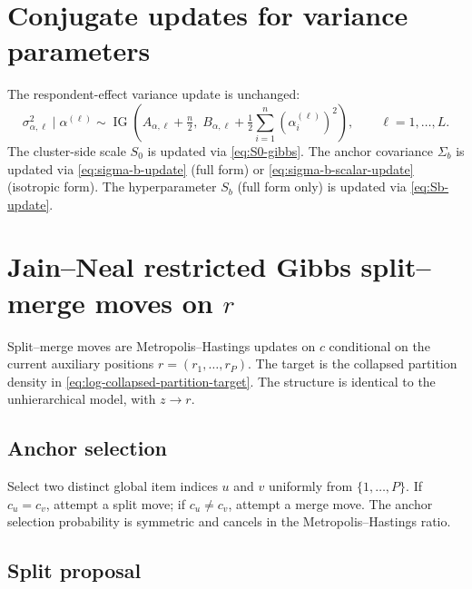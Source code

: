 \documentclass[11pt]{article}
\DeclareMathOperator{\IG}{IG}
\begin{document}
\section{Conjugate updates for variance parameters}

The respondent-effect variance update is unchanged:
\begin{equation}
    \sigma_{\alpha,\ell}^2\mid \alpha^{(\ell)}
    \sim\IG\!\left(A_{\alpha,\ell}+\tfrac{n}{2},\;
    B_{\alpha,\ell}+\tfrac{1}{2}\sum_{i=1}^{n}(\alpha_i^{(\ell)})^2\right),
    \qquad \ell=1,\dots,L.
    \label{eq:sigma-alpha-update}
\end{equation}
The cluster-side scale $S_0$ is updated via \eqref{eq:S0-gibbs}.  The
anchor covariance $\Sigma_b$ is updated via \eqref{eq:sigma-b-update} (full
form) or \eqref{eq:sigma-b-scalar-update} (isotropic form).  The
hyperparameter $S_b$ (full form only) is updated via \eqref{eq:Sb-update}.

\section{Jain--Neal restricted Gibbs split--merge moves on $r$}

Split--merge moves are Metropolis--Hastings updates on $c$ conditional on
the current auxiliary positions $r=(r_1,\dots,r_P)$.  The target is the
collapsed partition density in \eqref{eq:log-collapsed-partition-target}.
The structure is identical to the unhierarchical model, with $z\to r$.

\subsection{Anchor selection}

Select two distinct global item indices $u$ and $v$ uniformly from
$\{1,\dots,P\}$.  If $c_u=c_v$, attempt a split move; if $c_u\neq c_v$,
attempt a merge move.  The anchor selection probability is symmetric and
cancels in the Metropolis--Hastings ratio.

\subsection{Split proposal}
\end{document}

